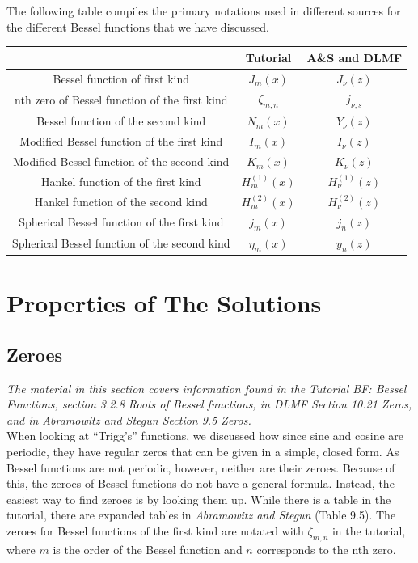 \documentclass[11pt]{report}
\newcommand{\fpar}[1]{\left({#1}\right)}
\begin{document}
The following table compiles the primary notations used in different sources for the different Bessel functions that we have discussed.
    \begin{center}
        \begin{tabular}{ |c| c c  |}
            \hline
              & Tutorial & A\&S and DLMF \\ 
              \hline
             Bessel function of first kind & $J_m\fpar{x}$ & $J_\nu\fpar{z}$ \\  
             nth zero of Bessel function of the first kind & $\zeta_{m,n}$ & $j_{\nu,s}$  \\ 
             Bessel function of the second kind & $N_m\fpar{x}$ & $Y_\nu\fpar{z}$ \\ 
             Modified Bessel function of the first kind & $I_m\fpar{x}$ & $I_\nu\fpar{z}$ \\ 
             Modified Bessel function of the second kind & $K_m\fpar{x}$ & $K_\nu\fpar{z}$ \\ 
             Hankel function of the first kind & $H^{(1)}_m\fpar{x}$ & $H^{(1)}_\nu\fpar{z}$ \\
             Hankel function of the second kind & $H^{(2)}_m\fpar{x}$ & $H^{(2)}_\nu\fpar{z}$  \\%
             Spherical Bessel function of the first kind & $j_m\fpar{x}$ & $j_n\fpar{z}$  \\
              Spherical Bessel function of the second kind & $\eta_m\fpar{x}$ & $y_n\fpar{z}$  \\
             \hline
        \end{tabular}
    \end{center}
    
    

\section{Properties of The Solutions}
\subsection{Zeroes}

\emph{The material in this section covers information found in the Tutorial BF: Bessel Functions, section 3.2.8 Roots of Bessel functions, in DLMF Section 10.21 Zeros, and in Abramowitz and Stegun Section 9.5 Zeros.}\\

When looking at ``Trigg's'' functions, we discussed how since sine and cosine are periodic, they have regular zeros that can be given in a simple, closed form. As Bessel functions are not periodic, however, neither are their zeroes. Because of this, the zeroes of Bessel functions do not have a general formula. Instead, the easiest way to find zeroes is by looking them up. While there is a table in the tutorial, there are expanded tables in \emph{Abramowitz and Stegun} (Table 9.5). The zeroes for Bessel functions of the first kind are notated with $\zeta_{m,n}$ in the tutorial, where $m$ is the order of the Bessel function and $n$ corresponds to the nth zero.\\
\end{document}
